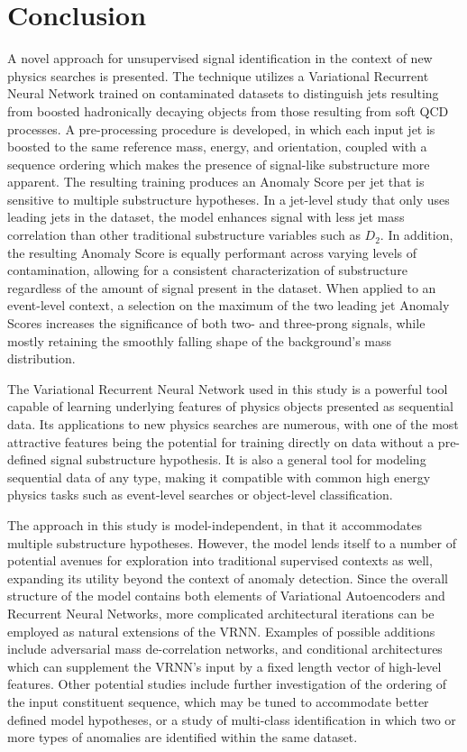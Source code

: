 \documentclass[12pt, a4paper]{article}
\begin{document}
\clearpage

\section*{Conclusion}

A novel approach for unsupervised signal identification in the context of new physics searches is presented. 
The technique utilizes a Variational Recurrent Neural Network trained on contaminated datasets to distinguish jets resulting from boosted hadronically decaying objects from those resulting from soft QCD processes. 
A pre-processing procedure is developed, in which each input jet is boosted to the same reference mass, energy, and orientation, coupled with a sequence ordering which makes the presence of signal-like substructure more apparent. 
The resulting training produces an Anomaly Score per jet that is sensitive to multiple substructure hypotheses. 
In a jet-level study that only uses leading jets in the dataset, the model enhances signal with less jet mass correlation than other traditional substructure variables such as $D_2$. 
In addition, the resulting Anomaly Score is equally performant across varying levels of contamination, allowing for a consistent characterization of substructure regardless of the amount of signal present in the dataset. 
When applied to an event-level context, a selection on the maximum of the two leading jet Anomaly Scores increases the significance of both two- and three-prong signals, while mostly retaining the smoothly falling shape of the background's mass distribution.

The Variational Recurrent Neural Network used in this study is a powerful tool capable of learning underlying features of physics objects presented as sequential data. 
Its applications to new physics searches are numerous, with one of the most attractive features being the potential for training directly on data without a pre-defined signal substructure hypothesis. 
It is also a general tool for modeling sequential data of any type, making it compatible with common high energy physics tasks such as event-level searches or object-level classification.

The approach in this study is model-independent, in that it accommodates multiple substructure hypotheses.
However, the model lends itself to a number of potential avenues for exploration into traditional supervised contexts as well, expanding its utility beyond the context of anomaly detection.
Since the overall structure of the model contains both elements of Variational Autoencoders and Recurrent Neural Networks, more complicated architectural iterations can be employed as natural extensions of the VRNN. 
Examples of possible additions include adversarial mass de-correlation networks, and conditional architectures which can supplement the VRNN's input by a fixed length vector of high-level features. Other potential studies include further investigation of the ordering of the input constituent sequence, which may be tuned to accommodate better defined model hypotheses, or a study of multi-class identification in which two or more types of anomalies are identified within the same dataset.
\end{document}
